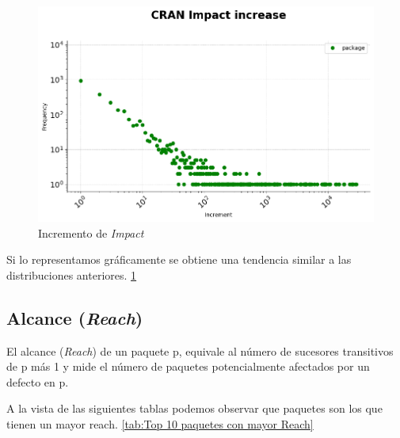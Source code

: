 \begin{figure}[ht!]
    \begin{center}
        \includegraphics[width=1\textwidth]{img/cran/impact_increase_dist.png}
        \caption{Incremento de \textit{Impact}}
        \label{fig:Incremento de Impact}
    \end{center}
\end{figure}

Si lo representamos gráficamente se obtiene una tendencia similar a las distribuciones anteriores. \ref{fig:Incremento de Impact}

\subsection{Alcance (\textit{Reach})}

El alcance (\textit{Reach}) de un paquete p, equivale al número de sucesores transitivos
de p más 1 y mide el número de paquetes potencialmente afectados
por un defecto en p.

A la vista de las siguientes tablas podemos observar que  paquetes
son los que tienen un mayor reach. \ref{tab:Top 10 paquetes con mayor Reach}

